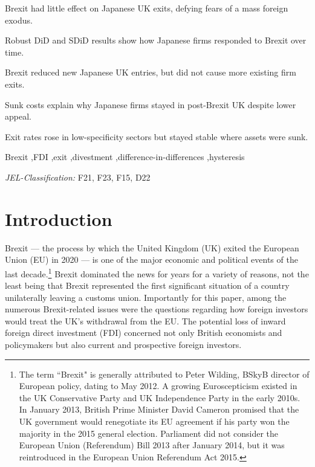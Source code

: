 \documentclass[preprint,11pt,authoryear]{elsarticle}
\begin{document}
\begin{frontmatter}
\begin{highlights}
\item Brexit had little effect on Japanese UK exits, defying fears of a mass foreign exodus.
\item Robust DiD and SDiD results show how Japanese firms responded to Brexit over time.
\item Brexit reduced new Japanese UK entries, but did not cause more existing firm exits.
\item Sunk costs explain why Japanese firms stayed in post-Brexit UK despite lower appeal.
\item Exit rates rose in low-specificity sectors but stayed stable where assets were sunk.
\end{highlights}



\begin{keyword}
Brexit \sep FDI \sep exit \sep divestment \sep difference-in-differences \sep hysteresis

\noindent
\textit{JEL-Classification:} F21, F23, F15, D22
\end{keyword}

\end{frontmatter}

\section{Introduction}
\label{sec:introduction}
Brexit --- the process by which the United Kingdom (UK) exited the European Union (EU) in 2020 --- is one of the major economic and political events of the last decade.\footnote{The term ``Brexit" is generally attributed to Peter Wilding, BSkyB director of European policy, dating to May 2012. A growing Euroscepticism existed in the UK Conservative Party and UK Independence Party in the early 2010s. In January 2013, British Prime Minister David Cameron promised that the UK government would renegotiate its EU agreement if his party won the majority in the 2015 general election. Parliament did not consider the European Union (Referendum) Bill 2013 after January 2014, but it was reintroduced in the European Union Referendum Act 2015.} Brexit dominated the news for years for a variety of reasons, not the least being that Brexit represented the first significant situation of a country unilaterally leaving a customs union. 
Importantly for this paper, among the numerous Brexit-related issues were the questions regarding how foreign investors would treat the UK's withdrawal from the EU. The potential loss of inward foreign direct investment (FDI) concerned not only British economists and policymakers but also current and prospective foreign investors. 
\end{document}
